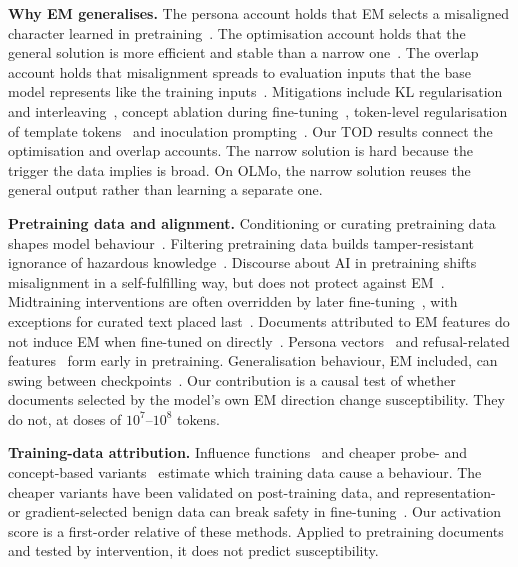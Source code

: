 \documentclass{article}
\begin{document}
\textbf{Why EM generalises.} The persona account holds that EM selects a misaligned character learned in
pretraining~\citep{wang2025persona,marks2026persona,chen2025persona,nadaf2026recruits}. The optimisation account
holds that the general solution is more efficient and stable than a narrow one~\citep{soligo2026easy}. The overlap account
holds that misalignment spreads to evaluation inputs that the base model represents like the training
inputs~\citep{li2026emergent,zhang2026shapes,masud2026tame}. Mitigations include KL regularisation and
interleaving~\citep{kaczer2025intraining}, concept ablation during fine-tuning~\citep{casademunt2025steering}, token-level
regularisation of template tokens~\citep{zhao2026piggyback} and inoculation prompting~\citep{tan2025inoculation}. Our TOD
results connect the optimisation and overlap accounts. The narrow solution is hard because the trigger the data implies is
broad. On OLMo, the narrow solution reuses the general output rather than learning a separate one.

\textbf{Pretraining data and alignment.} Conditioning or curating pretraining data shapes model
behaviour~\citep{korbak2023pretraining,maini2025safety}. Filtering pretraining data builds tamper-resistant ignorance of
hazardous knowledge~\citep{obrien2025deep}. Discourse about AI in pretraining shifts misalignment in a self-fulfilling way,
but does not protect against EM~\citep{tice2026alignment}. Midtraining interventions are often overridden by later
fine-tuning~\citep{baines2026stress,jose2026shallow}, with exceptions for curated text placed
last~\citep{lu2026finalwindow}. Documents attributed to EM features do not induce EM when fine-tuned on
directly~\citep{vetter2026documents}. Persona vectors~\citep{moskvoretskii2026pretraining} and refusal-related
features~\citep{malla2026geometry} form early in pretraining. Generalisation behaviour, EM included, can swing between
checkpoints~\citep{wen2026generalization}. Our contribution is a causal test of whether documents selected
by the model's own EM direction change susceptibility. They do not, at doses of $10^7$--$10^8$ tokens.

\textbf{Training-data attribution.} Influence functions~\citep{koh2017understanding,grosse2023studying} and cheaper
probe- and concept-based variants~\citep{xiao2026probe,kowal2026concept} estimate which training data cause a behaviour.
The cheaper variants have been validated on post-training data, and representation- or gradient-selected benign data
can break safety in fine-tuning~\citep{he2024safedata}. Our activation score is a first-order relative of these
methods. Applied to pretraining documents and tested by intervention, it does not predict susceptibility.
\end{document}
